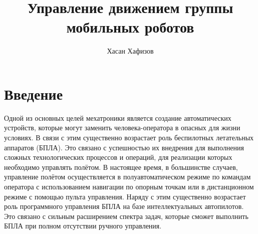 \documentclass[a4paper, 14pt]{extarticle}
\author{Хасан Хафизов}
\title{Управление движением группы мобильных роботов}
\let\Oldsection\section
\renewcommand{\section}{\FloatBarrier\Oldsection}
\begin{document}
	\maketitle
	\tableofcontents
\section{Введение}
Одной из основных целей мехатроники
является создание автоматических устройств, которые могут заменить
человека-оператора в опасных для жизни условиях. В связи с этим
существенно возрастает роль беспилотных летательных аппаратов (БПЛА).
Это связано с успешностью их внедрения для выполнения сложных
технологических процессов и операций, для реализации которых
необходимо управлять полётом. В настоящее время, в большинстве случаев, управление полётом
осуществляется в полуавтоматическом режиме по командам оператора с
использованием навигации по опорным точкам или в дистанционном режиме
с помощью пульта управления. Наряду с этим существенно возрастает роль
программного управления БПЛА на базе интеллектуальных автопилотов. Это связано с сильным расширением спектра задач, которые сможет выполнить БПЛА при полном отсутствии ручного управления. \par
\end{document}
